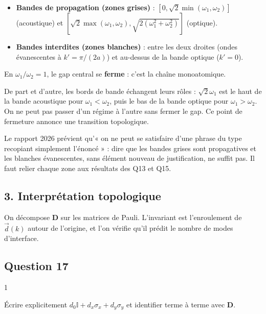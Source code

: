 \documentclass[11pt,a4paper]{article}
\providecommand{\tightlist}{\setlength{\itemsep}{0pt}\setlength{\parskip}{0pt}}
\begin{document}
\begin{itemize}
\tightlist
\item
  \textbf{Bandes de propagation (zones grises)} : \([0,\sqrt2\min(\omega_1,\omega_2)]\) (acoustique) et \([\sqrt2\max(\omega_1,\allowbreak \omega_2),\allowbreak \sqrt{2(\omega_1^2+\omega_2^2)}]\) (optique).
\item
  \textbf{Bandes interdites (zones blanches)} : entre les deux droites (ondes évanescentes à \(k'=\pi/(2a)\)) et au-dessus de la bande optique (\(k'=0\)).
\end{itemize}

En \(\omega_1/\omega_2=1\), le gap central se \textbf{ferme} : c'est la chaîne monoatomique.

De part et d'autre, les bords de bande échangent leurs rôles : \(\sqrt2\omega_1\) est le haut de la bande acoustique pour \(\omega_1<\omega_2\), puis le bas de la bande optique pour \(\omega_1>\omega_2\). On ne peut pas passer d'un régime à l'autre sans fermer le gap. Ce point de fermeture annonce une transition topologique.

\begin{jury}

Le rapport 2026 prévient qu'« on ne peut se satisfaire d'une phrase du type recopiant simplement l'énoncé » : dire que les bandes grises sont propagatives et les blanches évanescentes, sans élément nouveau de justification, ne suffit pas. Il faut relier chaque zone aux résultats des Q13 et Q15.

\end{jury}

\hypertarget{interpruxe9tation-topologique}{%
\subsection{3. Interprétation topologique}\label{interpruxe9tation-topologique}}

On décompose \(\mathbf D\) sur les matrices de Pauli. L'invariant est l'enroulement de \(\vec d(k)\) autour de l'origine, et l'on vérifie qu'il prédit le nombre de modes d'interface.

\hypertarget{question-17}{%
\subsection{Question 17}\label{question-17}}

\begin{indication}{1}

Écrire explicitement \(d_0\mathbb I+d_x\sigma_x+d_y\sigma_y\) et identifier terme à terme avec \(\mathbf D\).

\end{indication}
\end{document}
